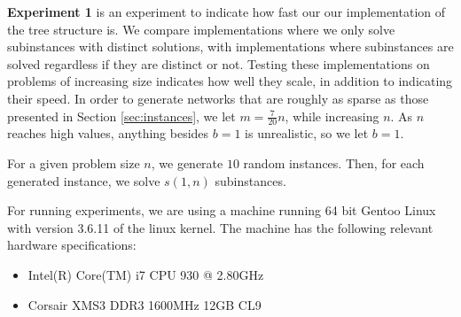 \textbf{Experiment 1} is an experiment to indicate how fast our
our implementation of the tree structure is. We compare implementations where
we only solve subinstances with distinct solutions, with implementations where
subinstances are solved regardless if they are distinct or not. Testing these
implementations on problems of increasing size indicates how well they scale,
in addition to indicating their speed.
In order to generate networks that are roughly as sparse as those
presented in Section \ref{sec:instances}, we let $m = \frac{7}{20}n$, while
increasing $n$. As $n$ reaches high values, anything besides $b = 1$ is
unrealistic, so we let $b = 1$.

For a given problem size $n$, we generate $10$ random instances. Then,
for each generated instance, we solve $s(1, n)$ subinstances.

For running experiments, we are using a machine running 64 bit Gentoo Linux
with version 3.6.11 of the linux kernel. The machine has the following
relevant hardware specifications:
\begin{itemize}
    \item Intel(R) Core(TM) i7 CPU 930 @ 2.80GHz
    \item Corsair XMS3 DDR3 1600MHz 12GB CL9
\end{itemize}
